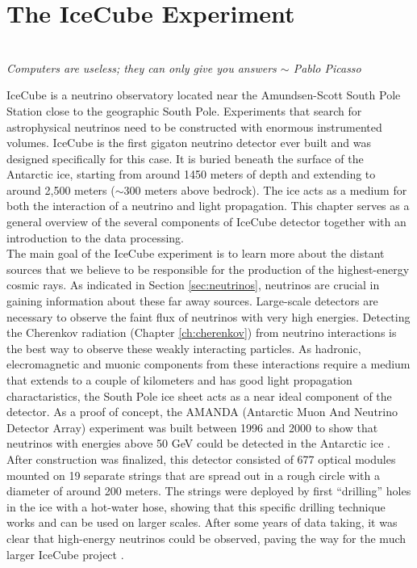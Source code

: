 \chapter{The IceCube Experiment}
\label{ch:icecube}
\begin{flushright}
\textit{\\Computers are useless; they can only give you answers $\sim$ Pablo Picasso\\}
\end{flushright}
IceCube is a neutrino observatory located near the Amundsen-Scott South Pole Station close to the geographic South Pole. Experiments that search for astrophysical neutrinos need to be constructed with enormous instrumented volumes. IceCube is the first gigaton neutrino detector ever built and was designed specifically for this case. It is buried beneath the surface of the Antarctic ice, starting from around 1450 meters of depth and extending to around 2,500 meters ($\sim$300 meters above bedrock). The ice acts as a medium for both the interaction of a neutrino and light propagation. This chapter serves as a general overview of the several components of IceCube detector together with an introduction to the data processing.\\
\newline
\noindent The main goal of the IceCube experiment is to learn more about the distant sources that we believe to be responsible for the production of the highest-energy cosmic rays. As indicated in Section \ref{sec:neutrinos}, neutrinos are crucial in gaining information about these far away sources. Large-scale detectors are necessary to observe the faint flux of neutrinos with very high energies. Detecting the Cherenkov radiation (Chapter \ref{ch:cherenkov}) from neutrino interactions is the best way to observe these weakly interacting particles. As hadronic, elecromagnetic and muonic components from these interactions require a medium that extends to a couple of kilometers and has good light propagation charactaristics, the South Pole ice sheet acts as a near ideal component of the detector. As a proof of concept, the AMANDA (Antarctic Muon And Neutrino Detector Array) experiment was built between 1996 and 2000 to show that neutrinos with energies above 50 GeV could be detected in the Antarctic ice \cite{amandaurl,Andres:1999hm}. After construction was finalized, this detector consisted of 677 optical modules mounted on 19 separate strings that are spread out in a rough circle with a diameter of around 200 meters. The strings were deployed by first ``drilling'' holes in the ice with a hot-water hose, showing that this specific drilling technique works and can be used on larger scales. After some years of data taking, it was clear that high-energy neutrinos could be observed, paving the way for the much larger IceCube project \cite{Ahrens:2002gq}.


